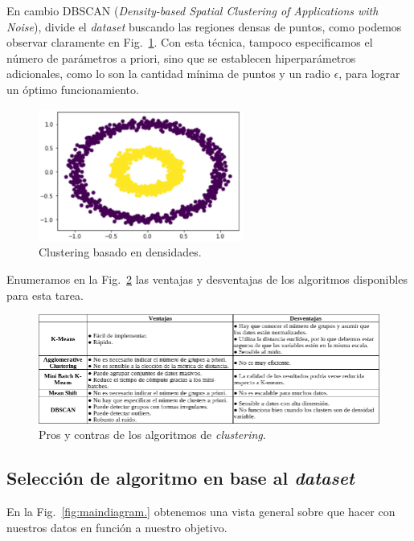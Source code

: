 \documentclass[a4paper,12pt]{article}
\begin{document}
En cambio DBSCAN (\textit{Density-based Spatial Clustering of Applications with Noise}), divide el \textit{dataset} buscando las regiones densas de puntos, como podemos observar claramente en Fig.~\ref{fig:DBSCAN.}. Con esta técnica, tampoco especificamos el número de parámetros a priori, sino que se establecen hiperparámetros adicionales, como lo son la cantidad mínima de puntos y un radio $\epsilon$, para lograr un óptimo funcionamiento.

\begin{figure}[H]
	\begin{center}				
	\includegraphics[width=0.6\textwidth]{tesis_17.png}
  	\caption{Clustering basado en densidades.}
  	\label{fig:DBSCAN.}
  	\end{center}
\end{figure}

Enumeramos en la Fig.~\ref{fig:proconsclustering.} las ventajas y desventajas de los algoritmos disponibles para esta tarea.

\begin{figure}[H]
	\begin{center}				
	\includegraphics[width=1\textwidth]{tesis_34.png}
  	\caption{Pros y contras de los algoritmos de \textit{clustering}.}
  	\label{fig:proconsclustering.}
  	\end{center}
\end{figure}

\clearpage

\subsection{Selección de algoritmo en base al \textit{dataset}}
En la Fig.~\ref{fig:maindiagram.} obtenemos una vista general sobre que hacer con nuestros datos en función a nuestro objetivo.
\end{document}
